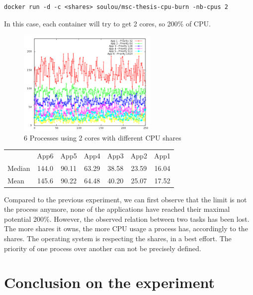 \begin{lstlisting}
docker run -d -c <shares> soulou/msc-thesis-cpu-burn -nb-cpus 2
\end{lstlisting}

In this case, each container will try to get 2 cores, so 200\% of CPU.

\begin{figure}[h1]
\begin{center}
	\includegraphics[width=0.6\textwidth]{./Images/CpuMonitor/vm/6_differentshares_2cores.png}
	\caption{6 Processes using 2 cores with different CPU shares}
\end{center}
\end{figure}

\vspace{2em}

\begin{center}
\begin{tabular}{l | c | c | c | c | c | c}
		& App6 & App5 & App4 & App3 & App2 & App1 \\
	Median  & 144.0 & 90.11 & 63.29 & 38.58 & 23.59 & 16.04 \\
	Mean    & 145.6 & 90.22 & 64.48 & 40.20 & 25.07 & 17.52
\end{tabular}
\end{center}

Compared to the previous experiment, we can first observe that the limit is not
the process anymore, none of the applications have reached their maximal
potential 200\%. However, the observed relation between two tasks has been
lost. The more shares it owns, the more CPU usage a process has, accordingly to
the shares. The operating system is respecting the shares, in a best effort.
The priority of one process over another can not be precisely defined.

\section{Conclusion on the experiment}

